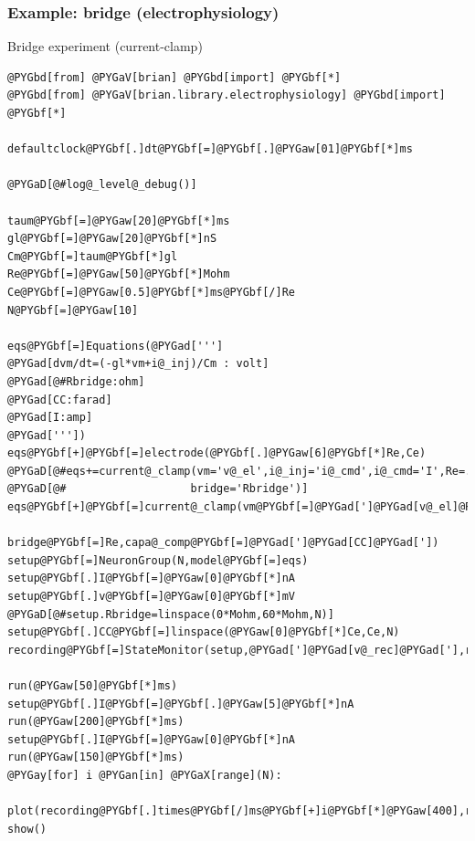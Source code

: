 \documentclass[letterpaper,10pt,english]{manual}
\begin{document}
\resetcurrentobjects
\hypertarget{--doc-examples-electrophysiology_bridge}{}

\hypertarget{index-38}{}\subsubsection{Example: bridge (electrophysiology)}

Bridge experiment (current-clamp)

\begin{Verbatim}[commandchars=@\[\]]
@PYGbd[from] @PYGaV[brian] @PYGbd[import] @PYGbf[*]
@PYGbd[from] @PYGaV[brian.library.electrophysiology] @PYGbd[import] @PYGbf[*]

defaultclock@PYGbf[.]dt@PYGbf[=]@PYGbf[.]@PYGaw[01]@PYGbf[*]ms

@PYGaD[@#log@_level@_debug()]

taum@PYGbf[=]@PYGaw[20]@PYGbf[*]ms
gl@PYGbf[=]@PYGaw[20]@PYGbf[*]nS
Cm@PYGbf[=]taum@PYGbf[*]gl
Re@PYGbf[=]@PYGaw[50]@PYGbf[*]Mohm
Ce@PYGbf[=]@PYGaw[0.5]@PYGbf[*]ms@PYGbf[/]Re
N@PYGbf[=]@PYGaw[10]

eqs@PYGbf[=]Equations(@PYGad[''']
@PYGad[dvm/dt=(-gl*vm+i@_inj)/Cm : volt]
@PYGad[@#Rbridge:ohm]
@PYGad[CC:farad]
@PYGad[I:amp]
@PYGad['''])
eqs@PYGbf[+]@PYGbf[=]electrode(@PYGbf[.]@PYGaw[6]@PYGbf[*]Re,Ce)
@PYGaD[@#eqs+=current@_clamp(vm='v@_el',i@_inj='i@_cmd',i@_cmd='I',Re=.4*Re,Ce=Ce,]
@PYGaD[@#                   bridge='Rbridge')]
eqs@PYGbf[+]@PYGbf[=]current@_clamp(vm@PYGbf[=]@PYGad[']@PYGad[v@_el]@PYGad['],i@_inj@PYGbf[=]@PYGad[']@PYGad[i@_cmd]@PYGad['],i@_cmd@PYGbf[=]@PYGad[']@PYGad[I]@PYGad['],Re@PYGbf[=]@PYGbf[.]@PYGaw[4]@PYGbf[*]Re,Ce@PYGbf[=]Ce,
                   bridge@PYGbf[=]Re,capa@_comp@PYGbf[=]@PYGad[']@PYGad[CC]@PYGad['])
setup@PYGbf[=]NeuronGroup(N,model@PYGbf[=]eqs)
setup@PYGbf[.]I@PYGbf[=]@PYGaw[0]@PYGbf[*]nA
setup@PYGbf[.]v@PYGbf[=]@PYGaw[0]@PYGbf[*]mV
@PYGaD[@#setup.Rbridge=linspace(0*Mohm,60*Mohm,N)]
setup@PYGbf[.]CC@PYGbf[=]linspace(@PYGaw[0]@PYGbf[*]Ce,Ce,N)
recording@PYGbf[=]StateMonitor(setup,@PYGad[']@PYGad[v@_rec]@PYGad['],record@PYGbf[=]@PYGaA[True])

run(@PYGaw[50]@PYGbf[*]ms)
setup@PYGbf[.]I@PYGbf[=]@PYGbf[.]@PYGaw[5]@PYGbf[*]nA
run(@PYGaw[200]@PYGbf[*]ms)
setup@PYGbf[.]I@PYGbf[=]@PYGaw[0]@PYGbf[*]nA
run(@PYGaw[150]@PYGbf[*]ms)
@PYGay[for] i @PYGan[in] @PYGaX[range](N):
    plot(recording@PYGbf[.]times@PYGbf[/]ms@PYGbf[+]i@PYGbf[*]@PYGaw[400],recording@PYGZlb[]i@PYGZrb[]@PYGbf[/]mV,@PYGad[']@PYGad[k]@PYGad['])
show()
\end{Verbatim}
\end{document}
